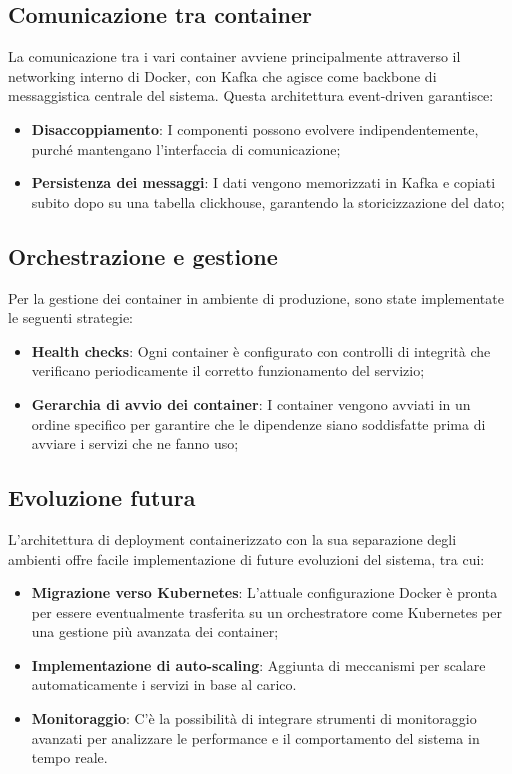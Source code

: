 \documentclass[10pt]{article}
\begin{document}
\subsection{Comunicazione tra container}
La comunicazione tra i vari container avviene principalmente attraverso il networking interno di Docker, con Kafka che agisce come backbone di messaggistica centrale del sistema. Questa architettura event-driven garantisce:

\begin{itemize}
    \item \textbf{Disaccoppiamento}: I componenti possono evolvere indipendentemente, purché mantengano l'interfaccia di comunicazione;
    \item \textbf{Persistenza dei messaggi}: I dati vengono memorizzati in Kafka e copiati subito dopo su una tabella clickhouse, garantendo la storicizzazione del dato;
\end{itemize}

\subsection{Orchestrazione e gestione}
Per la gestione dei container in ambiente di produzione, sono state implementate le seguenti strategie:

\begin{itemize}
    \item \textbf{Health checks}: Ogni container è configurato con controlli di integrità che verificano periodicamente il corretto funzionamento del servizio;
    \item \textbf{Gerarchia di avvio dei container}: I container vengono avviati in un ordine specifico per garantire che le dipendenze siano soddisfatte prima di avviare i servizi che ne fanno uso;
\end{itemize}

\subsection{Evoluzione futura}
L'architettura di deployment containerizzato con la sua separazione degli ambienti offre facile implementazione di future evoluzioni del sistema, tra cui:

\begin{itemize}
    \item \textbf{Migrazione verso Kubernetes}: L'attuale configurazione Docker è pronta per essere eventualmente trasferita su un orchestratore come Kubernetes per una gestione più avanzata dei container;
    \item \textbf{Implementazione di auto-scaling}: Aggiunta di meccanismi per scalare automaticamente i servizi in base al carico.
    \item \textbf{Monitoraggio}: C'è la possibilità di integrare strumenti di monitoraggio avanzati per analizzare le performance e il comportamento del sistema in tempo reale.
\end{itemize}
\end{document}
